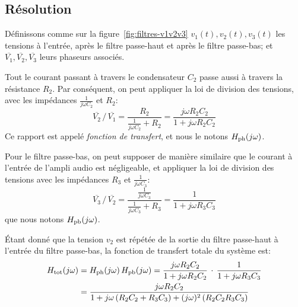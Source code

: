 \subsection{Résolution}

Définissons comme sur la figure~\ref{fig:filtres-v1v2v3}
$v_1(t),v_2(t),v_3(t)$ les tensions
à l'entrée, après le filtre passe-haut et après le filtre passe-bas;
et $\overline{V_1}, \overline{V_2}, \overline{V_3}$ leurs phaseurs associés.

Tout le courant passant à travers le condensateur $C_2$ passe
aussi à travers la résistance $R_2$.
Par conséquent, on peut appliquer la loi de division des tensions,
avec les impédances $\frac{1}{j\omega C_2}$ et $R_2$:
\begin{equation}
    \overline{V_2}\,\big/\,\overline{V_1}
    = \frac{R_2}{\frac{1}{j\omega C_2} + R_2}
    = \frac{j\omega R_2C_2}{1+j\omega R_2C_2}
\end{equation}
Ce rapport est appelé \emph{fonction de transfert}, et nous le notons
$H_{\mathrm{ph}}(j\omega)$.

Pour le filtre passe-bas, on peut supposer de manière similaire que
le courant à l'entrée de l'ampli audio est négligeable,
et appliquer la loi de division des tensions avec les impédances
$R_3$ et $\frac{1}{j\omega C_3}$:
\begin{equation}
    \overline{V_3}\,\big/\,\overline{V_2}
    = \frac{\frac{1}{j\omega C_3}}{\frac{1}{j\omega C_3} + R_3}
    = \frac{1}{1+j\omega R_3C_3}
\end{equation}
que nous notons $H_{\mathrm{pb}}(j\omega)$.

Étant donné que la tension $v_2$ est répétée de la sortie du filtre passe-haut
à l'entrée du filtre passe-bas, la fonction de transfert totale du système est:
\begin{align}
    H_{\mathrm{tot}}(j\omega) &= H_{\mathrm{ph}}(j\omega)\,H_{\mathrm{pb}}(j\omega) =
    \frac{j\omega R_2C_2}{1 + j\omega R_2C_2}\,\cdot\,
    \frac{1}{1 + j\omega R_3C_3}\\
    &= \frac{j\omega R_2C_2}{1 + j\omega\,(R_2C_2+R_3C_3) +
        (j\omega)^2\,(R_2C_2R_3C_3)}
\end{align}
